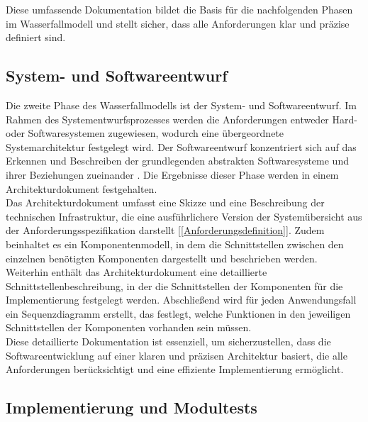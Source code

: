 Diese umfassende Dokumentation bildet die Basis für die nachfolgenden Phasen im Wasserfallmodell und stellt sicher, dass alle 
Anforderungen klar und präzise definiert sind.

\subsection{System- und Softwareentwurf}  \label{System- und Softwareentwurf}

Die zweite Phase des Wasserfallmodells ist der System- und Softwareentwurf. Im Rahmen des Systementwurfsprozesses werden die Anforderungen 
entweder Hard- oder Softwaresystemen zugewiesen, wodurch eine übergeordnete Systemarchitektur festgelegt wird. Der Softwareentwurf konzentriert 
sich auf das Erkennen und Beschreiben der grundlegenden abstrakten Softwaresysteme und ihrer Beziehungen zueinander \cite{Sommerville10}. Die 
Ergebnisse dieser Phase werden in einem Architekturdokument festgehalten.\\

Das Architekturdokument umfasst eine Skizze und eine Beschreibung der technischen Infrastruktur, die eine ausführlichere Version der Systemübersicht 
aus der Anforderungsspezifikation darstellt [\autoref{Anforderungsdefinition}]. Zudem beinhaltet es ein Komponentenmodell, in dem die Schnittstellen zwischen den einzelnen 
benötigten Komponenten dargestellt und beschrieben werden. Weiterhin enthält das Architekturdokument eine detaillierte Schnittstellenbeschreibung, 
in der die Schnittstellen der Komponenten für die Implementierung festgelegt werden. Abschließend wird für jeden Anwendungsfall ein Sequenzdiagramm 
erstellt, das festlegt, welche Funktionen in den jeweiligen Schnittstellen der Komponenten vorhanden sein müssen.\\

Diese detaillierte Dokumentation ist essenziell, um sicherzustellen, dass die Softwareentwicklung auf einer klaren und präzisen Architektur 
basiert, die alle Anforderungen berücksichtigt und eine effiziente Implementierung ermöglicht.

\subsection{Implementierung und Modultests}  \label{Implementierung und Modultests}

